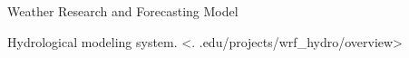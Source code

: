 \documentclass[letterpaper,12pt,english,openany,oneside]{sphinxmanual}
\begin{document}
\begin{description}
\sphinxAtStartPar
Weather Research and Forecasting Model

\sphinxAtStartPar
{\hyperref[\detokenize{glossary:term-WRF}]{}} Hydrological modeling system.   \textless{}.
.edu/projects/wrf\_hydro/overview\textgreater{}

\end{description}



\renewcommand{\indexname}{Index}
\printindex
\end{document}
